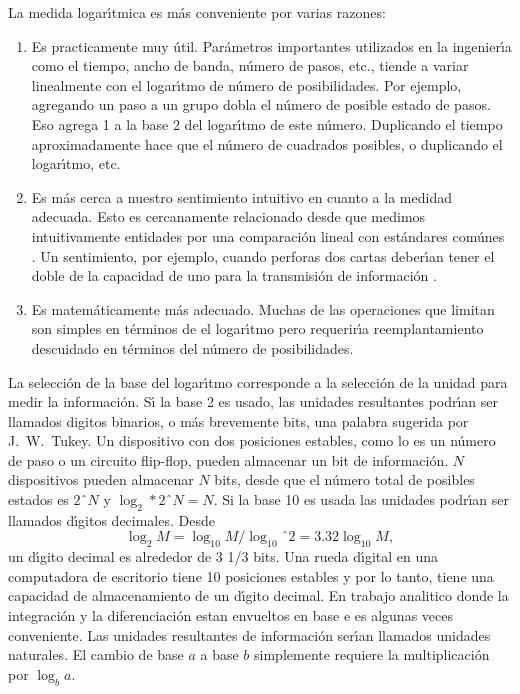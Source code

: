 La medida logar\'{\i}tmica es m\'{a}s conveniente por varias razones:
\begin{enumerate}
\item{Es practicamente muy \'{u}til. Par\'{a}metros importantes utilizados en la
ingenier\'{\i}a como el tiempo, ancho de banda, n\'{u}mero de pasos,
etc., tiende a variar linealmente con el logar\'{\i}tmo de n\'{u}mero
de posibilidades. Por ejemplo, agregando un paso a un grupo dobla el
n\'{u}mero de posible estado de pasos. Eso agrega 1 a la base 2 del
logar\'{\i}tmo de este n\'{u}mero. Duplicando el tiempo
aproximadamente hace que el n\'{u}mero de cuadrados posibles, o
duplicando el logar\'{\i}tmo, etc.}
\item{Es m\'{a}s cerca a nuestro sentimiento intuitivo en cuanto a la medidad
adecuada. Esto es cercanamente relacionado desde que medimos
intuitivamente entidades por una comparaci\'{o}n lineal con est\'{a}ndares
com\'{u}nes \cite{Nyquist1,Nyquist2}. Un sentimiento, por ejemplo, cuando perforas
dos cartas deber\'{\i}an tener el doble de la capacidad de uno para la
transmisi\'{o}n de informaci\'{o}n \cite{Hartley}.}
\item{Es matem\'{a}ticamente m\'{a}s adecuado. Muchas de las operaciones que
limitan son simples en t\'{e}rminos de el logar\'{\i}tmo pero requerir\'{\i}a
reemplantamiento descuidado en t\'{e}rminos del n\'{u}mero de posibilidades.}
\end{enumerate}

La selecci\'{o}n de la base del logar\'{\i}tmo corresponde a la
selecci\'{o}n de la unidad para medir la informaci\'{o}n. S\'{\i} la
base 2 es usado, las unidades resultantes podr\'{\i}an ser llamados
digitos binarios, o m\'{a}s brevemente bits, una palabra sugerida por
J.\ W.\ Tukey. Un dispositivo con dos posiciones estables, como lo es
un n\'{u}mero de paso o un circuito flip-flop, pueden almacenar un bit
de informaci\'{o}n. $N$ dispositivos pueden almacenar $N$ bits, desde
que el n\'{u}mero total de posibles estados es $2ˆN$ y $\log_2 * 2ˆN =
N$. Si la base 10 es usada las unidades podr\'{\i}an ser llamados
d\'{\i}gitos decimales. Desde
\begin{equation}
\log_2 M = \log_10 M / \log_10ˆ2 = 3.32 \log_10 M,
\end{equation}
un d\'{\i}gito decimal es alrededor de 3 1/3
bits. Una rueda d\'{\i}gital en una computadora de escritorio tiene 10
posiciones estables y por lo tanto, tiene una capacidad de
almacenamiento de un d\'{\i}gito decimal. En trabajo analitico donde
la integraci\'{o}n y la diferenciaci\'{o}n estan envueltos en base e
es algunas veces conveniente. Las unidades resultantes de
informaci\'{o}n ser\'{\i}an llamados unidades naturales. El cambio de
base $a$ a base $b$ simplemente requiere la multiplicaci\'{o}n por
$\log_b a$.

